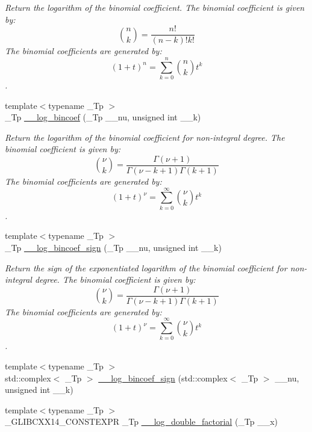 \begin{DoxyCompactItemize}
\begin{DoxyCompactList}\small\item\em Return the logarithm of the binomial coefficient. The binomial coefficient is given by\+: \[ \binom{n}{k} = \frac{n!}{(n-k)! k!} \] The binomial coefficients are generated by\+: \[ \left(1 + t\right)^n = \sum_{k=0}^n \binom{n}{k} t^k \]. \end{DoxyCompactList}\item 
{\footnotesize template$<$typename \+\_\+\+Tp $>$ }\\\+\_\+\+Tp \hyperlink{namespacestd_1_1____detail_abd174c4887c0f3bbb5125e2a65856386}{\+\_\+\+\_\+log\+\_\+bincoef} (\+\_\+\+Tp \+\_\+\+\_\+nu, unsigned int \+\_\+\+\_\+k)
\begin{DoxyCompactList}\small\item\em Return the logarithm of the binomial coefficient for non-\/integral degree. The binomial coefficient is given by\+: \[ \binom{\nu}{k} = \frac{\Gamma(\nu+1)}{\Gamma(\nu-k+1) \Gamma(k+1)} \] The binomial coefficients are generated by\+: \[ \left(1 + t\right)^\nu = \sum_{k=0}^\infty \binom{\nu}{k} t^k \]. \end{DoxyCompactList}\item 
{\footnotesize template$<$typename \+\_\+\+Tp $>$ }\\\+\_\+\+Tp \hyperlink{namespacestd_1_1____detail_a6cea85f06264c3c9b05a76012205a0ca}{\+\_\+\+\_\+log\+\_\+bincoef\+\_\+sign} (\+\_\+\+Tp \+\_\+\+\_\+nu, unsigned int \+\_\+\+\_\+k)
\begin{DoxyCompactList}\small\item\em Return the sign of the exponentiated logarithm of the binomial coefficient for non-\/integral degree. The binomial coefficient is given by\+: \[ \binom{\nu}{k} = \frac{\Gamma(\nu+1)}{\Gamma(\nu-k+1) \Gamma(k+1)} \] The binomial coefficients are generated by\+: \[ \left(1 + t\right)^\nu = \sum_{k=0}^\infty \binom{\nu}{k} t^k \]. \end{DoxyCompactList}\item 
{\footnotesize template$<$typename \+\_\+\+Tp $>$ }\\std\+::complex$<$ \+\_\+\+Tp $>$ \hyperlink{namespacestd_1_1____detail_acaa1cf71cfd1d1ec4e897a9b9d10e8a1}{\+\_\+\+\_\+log\+\_\+bincoef\+\_\+sign} (std\+::complex$<$ \+\_\+\+Tp $>$ \+\_\+\+\_\+nu, unsigned int \+\_\+\+\_\+k)
\item 
{\footnotesize template$<$typename \+\_\+\+Tp $>$ }\\\+\_\+\+G\+L\+I\+B\+C\+X\+X14\+\_\+\+C\+O\+N\+S\+T\+E\+X\+PR \+\_\+\+Tp \hyperlink{namespacestd_1_1____detail_a0de46e790512550b535bdda97e11e1b5}{\+\_\+\+\_\+log\+\_\+double\+\_\+factorial} (\+\_\+\+Tp \+\_\+\+\_\+x)

\end{DoxyCompactItemize}
